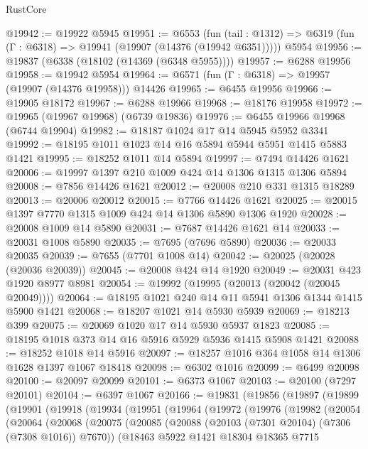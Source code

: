 \begin{lexlean}{RustCore}
\begin{coremodule}
@19942 := @19922 @5945
@19951 := @6553
    (fun (tail : @1312) => @6319 (fun (Γ : @6318) => @19941 (@19907 (@14376 (@19942 @6351)))))
    @5954
@19956 := @19837 (@6338 (@18102 (@14369 (@6348 @5955))))
@19957 := @6288 @19956
@19958 := @19942 @5954
@19964 := @6571 (fun (Γ : @6318) => @19957 (@19907 (@14376 @19958))) @14426
@19965 := @6455 @19956
@19966 := @19905 @18172
@19967 := @6288 @19966
@19968 := @18176 @19958
@19972 := @19965 (@19967 @19968) (@6739 @19836)
@19976 := @6455 @19966 @19968 (@6744 @19904)
@19982 := @18187 @1024 @17 @14 @5945 @5952 @3341
@19992 := @18195 @1011 @1023 @14 @16 @5894 @5944 @5951 @1415 @5883 @1421
@19995 := @18252 @1011 @14 @5894
@19997 := @7494 @14426 @1621
@20006 := @19997 @1397 @210 @1009 @424 @14 @1306 @1315 @1306 @5894
@20008 := @7856 @14426 @1621
@20012 := @20008 @210 @331 @1315 @18289
@20013 := @20006 @20012
@20015 := @7766 @14426 @1621
@20025 := @20015 @1397 @7770 @1315 @1009 @424 @14 @1306 @5890 @1306 @1920
@20028 := @20008 @1009 @14 @5890
@20031 := @7687 @14426 @1621 @14
@20033 := @20031 @1008 @5890
@20035 := @7695 (@7696 @5890)
@20036 := @20033 @20035
@20039 := @7655 (@7701 @1008 @14)
@20042 := @20025 (@20028 (@20036 @20039))
@20045 := @20008 @424 @14 @1920
@20049 := @20031 @423 @1920 @8977 @8981
@20054 := @19992 (@19995 (@20013 (@20042 (@20045 @20049))))
@20064 := @18195 @1021 @240 @14 @11 @5941 @1306 @1344 @1415 @5900 @1421
@20068 := @18207 @1021 @14 @5930 @5939
@20069 := @18213 @399
@20075 := @20069 @1020 @17 @14 @5930 @5937 @1823
@20085 := @18195 @1018 @373 @14 @16 @5916 @5929 @5936 @1415 @5908 @1421
@20088 := @18252 @1018 @14 @5916
@20097 := @18257 @1016 @364 @1058 @14 @1306 @1628 @1397 @1067 @18418
@20098 := @6302 @1016
@20099 := @6499 @20098
@20100 := @20097 @20099
@20101 := @6373 @1067
@20103 := @20100 (@7297 @20101)
@20104 := @6397 @1067
@20166 := @19831
    (@19856
      (@19897
        (@19899
          (@19901
            (@19918
              (@19934
                (@19951
                  (@19964
                    (@19972
                      (@19976
                        (@19982
                          (@20054
                            (@20064
                              (@20068
                                (@20075
                                  (@20085
                                    (@20088 (@20103 (@7301 @20104) (@7306 (@7308 @1016)) @7670))
                                    (@18463
                                      @5922
                                      @1421
                                      @18304
                                      @18365
                                      @7715

\end{coremodule}
\end{lexlean}

